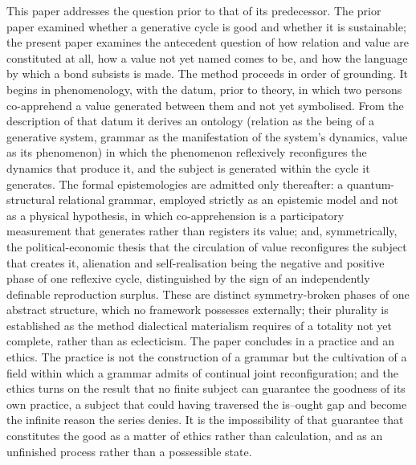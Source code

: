 \noindent
This paper addresses the question prior to that of its predecessor. The prior paper examined whether a generative cycle is good and whether it is sustainable; the present paper examines the antecedent question of how relation and value are constituted at all, how a value not yet named comes to be, and how the language by which a bond subsists is made. The method proceeds in order of grounding. It begins in phenomenology, with the datum, prior to theory, in which two persons co-apprehend a value generated between them and not yet symbolised. From the description of that datum it derives an ontology (relation as the being of a generative system, grammar as the manifestation of the system's dynamics, value as its phenomenon) in which the phenomenon reflexively reconfigures the dynamics that produce it, and the subject is generated within the cycle it generates. The formal epistemologies are admitted only thereafter: a quantum-structural relational grammar, employed strictly as an epistemic model and not as a physical hypothesis, in which co-apprehension is a participatory measurement that generates rather than registers its value; and, symmetrically, the political-economic thesis that the circulation of value reconfigures the subject that creates it, alienation and self-realisation being the negative and positive phase of one reflexive cycle, distinguished by the sign of an independently definable reproduction surplus. These are distinct symmetry-broken phases of one abstract structure, which no framework possesses externally; their plurality is established as the method dialectical materialism requires of a totality not yet complete, rather than as eclecticism. The paper concludes in a practice and an ethics. The practice is not the construction of a grammar but the cultivation of a field within which a grammar admits of continual joint reconfiguration; and the ethics turns on the result that no finite subject can guarantee the goodness of its own practice, a subject that could having traversed the is--ought gap and become the infinite reason the series denies. It is the impossibility of that guarantee that constitutes the good as a matter of ethics rather than calculation, and as an unfinished process rather than a possessible state.
